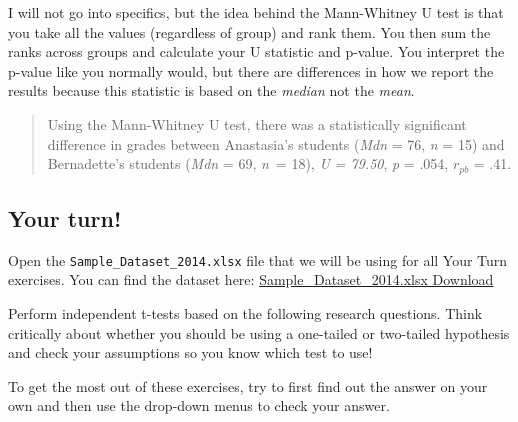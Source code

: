 \documentclass[
]{book}
\begin{document}
I will not go into specifics, but the idea behind the Mann-Whitney U test is that you take all the values (regardless of group) and rank them. You then sum the ranks across groups and calculate your U statistic and p-value. You interpret the p-value like you normally would, but there are differences in how we report the results because this statistic is based on the \emph{median} not the \emph{mean}.

\begin{quote}
Using the Mann-Whitney U test, there was a statistically significant difference in grades between Anastasia's students (\emph{Mdn} = 76, \emph{n} = 15) and Bernadette's students (\emph{Mdn} = 69, \emph{n}~= 18), \emph{U = 79.50}, \emph{p} = .054, \(r_{pb}\) = .41.
\end{quote}

\hypertarget{your-turn-1}{%
\subsection{Your turn!}\label{your-turn-1}}

Open the \texttt{Sample\_Dataset\_2014.xlsx} file that we will be using for all Your Turn exercises. You can find the dataset here: \href{https://github.com/danawanzer/stats-with-jamovi/blob/master/data/Sample_Dataset_2014.xlsx}{Sample\_Dataset\_2014.xlsx Download}

Perform independent t-tests based on the following research questions. Think critically about whether you should be using a one-tailed or two-tailed hypothesis and check your assumptions so you know which test to use!

To get the most out of these exercises, try to first find out the answer on your own and then use the drop-down menus to check your answer.
\end{document}
